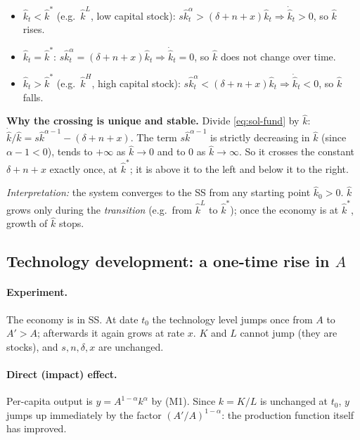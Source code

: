 \begin{itemize}
  \item $\hat k_t<\hat k^{*}$ (e.g.\ $\hat k^L$, low capital stock): $s\hat k_t^{\alpha}>(\delta+n+x)\hat k_t\Rightarrow\dot{\hat k}_t>0$, so $\hat k$ rises.
  \item $\hat k_t=\hat k^{*}$: $s\hat k_t^{\alpha}=(\delta+n+x)\hat k_t\Rightarrow\dot{\hat k}_t=0$, so $\hat k$ does not change over time.
  \item $\hat k_t>\hat k^{*}$ (e.g.\ $\hat k^H$, high capital stock): $s\hat k_t^{\alpha}<(\delta+n+x)\hat k_t\Rightarrow\dot{\hat k}_t<0$, so $\hat k$ falls.
\end{itemize}
\textbf{Why the crossing is unique and stable.} Divide \eqref{eq:sol-fund} by $\hat k$: $\dot{\hat k}/\hat k = s\hat k^{\alpha-1}-(\delta+n+x)$. The term $s\hat k^{\alpha-1}$ is strictly decreasing in $\hat k$ (since $\alpha-1<0$), tends to $+\infty$ as $\hat k\to0$ and to $0$ as $\hat k\to\infty$. So it crosses the constant $\delta+n+x$ exactly once, at $\hat k^*$; it is above it to the left and below it to the right.

\textit{Interpretation:} the system converges to the SS from any starting point $\hat k_0>0$. $\hat k$ grows only during the \emph{transition} (e.g.\ from $\hat k^L$ to $\hat k^{*}$); once the economy is at $\hat k^*$, growth of $\hat k$ stops.

\subsection{Technology development: a one-time rise in \texorpdfstring{$A$}{A} }

\paragraph{Experiment.} The economy is in SS. At date $t_0$ the technology level jumps once from $A$ to $A'>A$; afterwards it again grows at rate $x$. $K$ and $L$ cannot jump (they are stocks), and $s,n,\delta,x$ are unchanged.

\paragraph{Direct (impact) effect.} Per-capita output is $y=A^{1-\alpha}k^{\alpha}$ by (M1). Since $k=K/L$ is unchanged at $t_0$, $y$ jumps up immediately by the factor $(A'/A)^{1-\alpha}$: the production function itself has improved.

